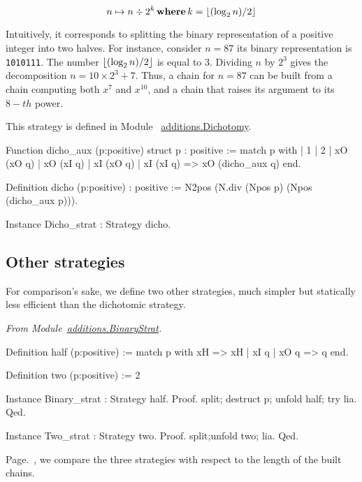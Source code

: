 $$n \mapsto  n \div {2^k} \,\textbf{where}\, k=\lfloor(\log_2{n})/2\rfloor$$

Intuitively, it corresponds to splitting the binary representation of a positive
integer into two halves. For instance, consider $n=87$ its binary representation
is \texttt{1010111}. The number $\lfloor(\log_2{n})/2\rfloor$ is equal to $3$.
Dividing $n$ by $2^3$ gives the decomposition $n=10 \times 2^3 + 7$.
Thus, a chain for $n=87$ can be built from a chain computing both $x^7$ and $x^{10}$,
and a chain that raises its argument to its $8-th$ power.


This strategy is defined in Module ~\href{../theories/html/hydras.additions.Dichotomy.html}{additions.Dichotomy}.


\begin{Coqsrc}
Function dicho_aux (p:positive) {struct p} : positive :=
 match p with
   | 1%
   | 2%
   | xO (xO q) | xO (xI q) | xI (xO q) | xI (xI q) =>
                                         xO (dicho_aux q)
 end.

Definition dicho  (p:positive) : positive :=
  N2pos (N.div (Npos p) (Npos (dicho_aux p))). 

Instance Dicho_strat : Strategy dicho.
\end{Coqsrc}


\subsection{Other strategies}
For comparison's sake, we define two other strategies, much simpler but statically less efficient than the dichotomic strategy.

\emph{From Module~\href{../theories/html/hydras.additions.BinaryStrat.html}{additions.BinaryStrat}.}

\begin{Coqsrc}
Definition half (p:positive) :=
  match p with xH => xH
          |    xI q | xO q =>  q
  end.

Definition two (p:positive) := 2%

Instance Binary_strat : Strategy half.
Proof.
  split; destruct p; unfold half; try lia.
Qed.

Instance Two_strat : Strategy two.
Proof.
  split;unfold two; lia.
Qed.
\end{Coqsrc}

Page.~\pageref{sect:test-strat}, we compare the three strategies with respect to the length of the built chains.

